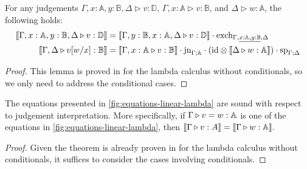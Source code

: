 \begin{lemma} \label{lem:sub_exch}
  For any judgements $\Gamma, x: \mathbb{A}, y: \mathbb{B}, \Delta \triangleright v : \mathbb{D}$, $\Gamma, x: \mathbb{A} \triangleright v: \mathbb{B}$, and $\Delta \triangleright w: \mathbb{A}$, the following holds:
\begin{equation*}
\begin{split}
  \llbracket \Gamma, x: \mathbb{A}, y: \mathbb{B}, \Delta \triangleright v : \mathbb{D} \rrbracket & = \llbracket \Gamma,  y: \mathbb{B}, x: \mathbb{A}, \Delta \triangleright v : \mathbb{D} \rrbracket \cdot \text{exch}_{\Gamma, \underline{x: \mathbb{A}, y: \mathbb{B}}, \Delta}\\
  \llbracket \Gamma,\Delta \triangleright v[w/x]: \mathbb{B} \rrbracket & = \llbracket \Gamma, x: \mathbb{A} \triangleright v: \mathbb{B} \rrbracket \cdot \text{jn}_{\Gamma;\mathbb{A}} \cdot (\mathrm{id} \otimes \llbracket \Delta \triangleright w: \mathbb{A} \rrbracket ) \cdot \text{sp}_{\Gamma; \Delta} 
\end{split}
\end{equation*}
\end{lemma}


\begin{proof}
  This lemma is proved in \cite[Lemma 2.2]{dahlqvist2022syntactic} for the lambda calculus without conditionals, so we only need to address the conditional cases.
\end{proof}




\begin{theorem} \label{thm:soundness_classical}
The equations presented in \autoref{fig:equations-linear-lambda} are sound with respect to judgement interpretation. 
More specifically, if \(\Gamma \triangleright v = w : \mathbb{A}\) is one of the equations in \autoref{fig:equations-linear-lambda}, then 
$\llbracket \Gamma \triangleright v : A  \rrbracket = \llbracket  \Gamma \triangleright w : \mathbb{A}\rrbracket.$
\end{theorem}

\begin{proof}
  Given the theorem is already proven in \cite[Theorem 2.3]{dahlqvist2022syntactic} for the lambda calculus without conditionals, it suffices to consider the cases involving conditionals.
\end{proof}

